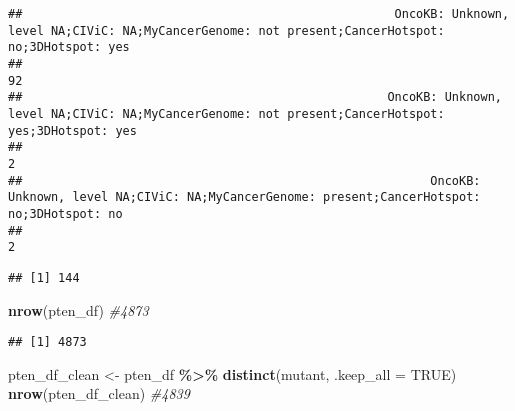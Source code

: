 \documentclass[
]{article}
\newenvironment{Shaded}{\begin{snugshade}}{\end{snugshade}}
\newcommand{\AttributeTok}[1]{\textcolor[rgb]{0.13,0.29,0.53}{#1}}
\newcommand{\CommentTok}[1]{\textcolor[rgb]{0.56,0.35,0.01}{\textit{#1}}}
\newcommand{\ConstantTok}[1]{\textcolor[rgb]{0.56,0.35,0.01}{#1}}
\newcommand{\FunctionTok}[1]{\textcolor[rgb]{0.13,0.29,0.53}{\textbf{#1}}}
\newcommand{\NormalTok}[1]{#1}
\newcommand{\OtherTok}[1]{\textcolor[rgb]{0.56,0.35,0.01}{#1}}
\newcommand{\SpecialCharTok}[1]{\textcolor[rgb]{0.81,0.36,0.00}{\textbf{#1}}}
\newcommand{\StringTok}[1]{\textcolor[rgb]{0.31,0.60,0.02}{#1}}
\begin{document}
\begin{verbatim}
##                                                    OncoKB: Unknown, level NA;CIViC: NA;MyCancerGenome: not present;CancerHotspot: no;3DHotspot: yes 
##                                                                                                                                                  92 
##                                                   OncoKB: Unknown, level NA;CIViC: NA;MyCancerGenome: not present;CancerHotspot: yes;3DHotspot: yes 
##                                                                                                                                                   2 
##                                                         OncoKB: Unknown, level NA;CIViC: NA;MyCancerGenome: present;CancerHotspot: no;3DHotspot: no 
##                                                                                                                                                   2
\end{verbatim}

\begin{Shaded}
\end{Shaded}

\begin{verbatim}
## [1] 144
\end{verbatim}

\begin{Shaded}
\begin{Highlighting}[]
\FunctionTok{nrow}\NormalTok{(pten\_df) }\CommentTok{\#4873}
\end{Highlighting}
\end{Shaded}

\begin{verbatim}
## [1] 4873
\end{verbatim}

\begin{Shaded}
\begin{Highlighting}[]
\NormalTok{pten\_df\_clean }\OtherTok{\textless{}{-}}\NormalTok{ pten\_df }\SpecialCharTok{\%\textgreater{}\%} \FunctionTok{distinct}\NormalTok{(mutant, }\AttributeTok{.keep\_all =} \ConstantTok{TRUE}\NormalTok{)}
\FunctionTok{nrow}\NormalTok{(pten\_df\_clean) }\CommentTok{\#4839}
\end{Highlighting}
\end{Shaded}
\end{document}
